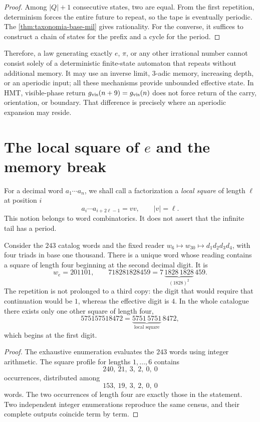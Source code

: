 \begin{proof}
Among \(|Q|+1\) consecutive states, two are equal. From the first
repetition, determinism forces the entire future to repeat, so the
tape is eventually periodic. The \cref{thm:taxonomia-base-mil} gives
rationality. For the converse, it suffices to construct a chain of states for the
prefix and a cycle for the period.
\end{proof}

Therefore, a law generating exactly \(e\), \(\pi\), or any other
irrational number cannot consist solely of a deterministic finite-state
automaton that repeats without additional memory. It may use an inverse
limit, 3-adic memory, increasing depth, or an
aperiodic input; all these mechanisms provide unbounded effective state.
In HMT, visible-phase return
\(g_{\rm vis}(n+9)=g_{\rm vis}(n)\) does not force return of the carry,
orientation, or boundary. That difference is precisely where
an aperiodic expansion may reside.

\section{The local square of \texorpdfstring{\(e\)}{e} and the memory break}

For a decimal word \(a_1\cdots a_n\), we shall call a factorization a \emph{local square}
of length \(\ell\) at position \(i\)
\[
 a_i\cdots a_{i+2\ell-1}=vv,
 \qquad |v|=\ell.
\]
This notion belongs to word combinatorics. It does not assert that the
infinite tail has a period.

\begin{theorem}
\label{thm:cuadrado-local-e}
Consider the \(243\) catalog words and the fixed reader
\(w_6\mapsto w_{30}\mapsto d_1d_2d_3d_4\), with four triads in base one thousand.
There is a unique word whose reading contains a square of length four
beginning at the second decimal digit. It is
\[
 w_e=201101,
 \qquad
 718281828459=7\,\underbrace{1828\,1828}_{(1828)^2}\,459.
\]
The repetition is not prolonged to a third copy: the digit that would require that
continuation would be \(1\), whereas the effective digit is \(4\). In the whole
catalogue there exists only one other square of length four,
\[
 575157518472=\underbrace{5751\,5751}_{\text{local square}}\,8472,
\]
which begins at the first digit.
\end{theorem}

\begin{proof}
The exhaustive enumeration evaluates the \(243\) words using integer
arithmetic. The square profile for lengths \(1,\ldots,6\) contains
\[
 240,\ 21,\ 3,\ 2,\ 0,\ 0
\]
occurrences, distributed among
\[
 153,\ 19,\ 3,\ 2,\ 0,\ 0
\]
words. The two occurrences of length four are exactly those in the
statement. Two independent integer enumerations reproduce the same census,
and their complete outputs coincide term by term.
\end{proof}

